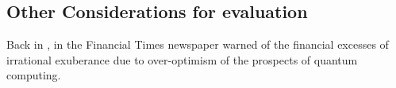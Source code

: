 \subsection{Other Considerations for evaluation}

Back in \citeyear{Ft:Gourianov:2022} \citeauthor{Ft:Gourianov:2022}, in the Financial Times newspaper \cite{Ft:Gourianov:2022}
warned of the financial excesses of irrational exuberance due to over-optimism of the prospects of quantum computing.  
